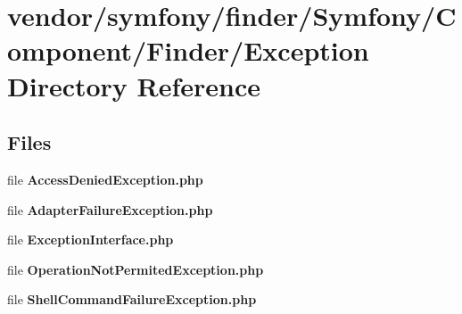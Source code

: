 \section{vendor/symfony/finder/\+Symfony/\+Component/\+Finder/\+Exception Directory Reference}
\label{dir_ab7a59af0055a86e0fb62120b8dc694c}
\subsection*{Files}
\begin{DoxyCompactItemize}
\item 
file {\bf Access\+Denied\+Exception.\+php}
\item 
file {\bf Adapter\+Failure\+Exception.\+php}
\item 
file {\bf Exception\+Interface.\+php}
\item 
file {\bf Operation\+Not\+Permited\+Exception.\+php}
\item 
file {\bf Shell\+Command\+Failure\+Exception.\+php}
\end{DoxyCompactItemize}

